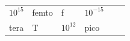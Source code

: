 {{\begin{center}
\begin{xtabular}[t]{|l|l|l|l|l|l|}
                \begin{math}{10}^{15}\end{math}
               &
    
    
        femto &
    
    
        f &
    
    
        
                \begin{math}{10}^{-15}\end{math}
     \tabularnewline{}
    
    
        tera &
    
    
        T &
    
    
        
                \begin{math}{10}^{12}\end{math}
               &
    
    
        pico &
    

\end{xtabular}
\end{center}}}
